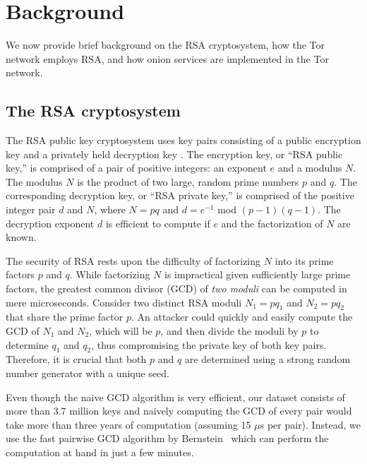 \section{Background}
\label{sec:background}
We now provide brief background on the RSA cryptosystem, how the Tor
network employs RSA, and how onion services are implemented in the Tor network.

\subsection{The RSA cryptosystem}
The RSA public key cryptosystem uses key pairs consisting of a public encryption
key and a privately held decryption key \cite{Rivest1978a}. The encryption key,
or ``RSA public key,'' is comprised of a pair of positive integers: an exponent
$e$ and a modulus $N$. The modulus $N$ is the product of two large, random prime
numbers $p$ and $q$. The corresponding decryption key, or ``RSA private key,''
is comprised of the positive integer pair $d$ and $N$, where $N = pq$ and $d =
e^{-1}$ mod $(p - 1)(q - 1)$.  The decryption exponent $d$ is efficient to
compute if $e$ and the factorization of $N$ are known.

The security of RSA rests upon the difficulty of factorizing $N$ into its prime
factors $p$ and $q$.  While factorizing $N$ is impractical given sufficiently
large prime factors, the greatest common divisor (GCD) of \emph{two moduli} can
be computed in mere microseconds.  Consider two distinct RSA moduli $N_1 = pq_1$
and $N_2 = pq_2$ that share the prime factor $p$.  An attacker could quickly and
easily compute the GCD of $N_1$ and $N_2$, which will be $p$, and then divide the
moduli by $p$ to determine $q_1$ and $q_2$, thus compromising the private key of
both key pairs.  Therefore, it is crucial that both $p$ and $q$ are determined
using a strong random number generator with a unique seed.

Even though the naive GCD algorithm is very efficient, our dataset consists of
more than 3.7 million keys and naively computing the GCD of every pair would
take more than three years of computation (assuming 15 $\mu$s per pair).
Instead, we use the fast pairwise GCD algorithm by Bernstein~\cite{Bernstein04}
which can perform the computation at hand in just a few minutes.

